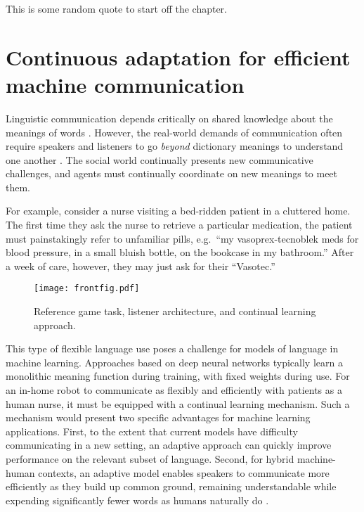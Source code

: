 \begin{savequote}[75mm]
This is some random quote to start off the chapter.
\end{savequote}

\chapter{Continuous adaptation for efficient machine communication}
\graphicspath{{./figures/nn_modeling/}}

Linguistic communication depends critically on shared knowledge about the meanings of words \cite{Lewis69_Convention}. 
However, the real-world demands of communication often require speakers and listeners to go \emph{beyond} dictionary meanings to understand one another \cite{clark_using_1996,stolk2016conceptual}. 
The social world continually presents new communicative challenges, and agents must continually coordinate on new meanings to meet them. %

For example, consider a nurse visiting a bed-ridden patient in a cluttered home.
The first time they ask the nurse to retrieve a particular medication, the patient must painstakingly refer to unfamiliar pills, e.g.~``my vasoprex-tecnoblek meds for blood pressure, in a small bluish bottle, on the bookcase in my bathroom.''
After a week of care, however, they may just ask for their ``Vasotec.'' 

\begin{figure}[t]
\centering
\texttt{[image: frontfig.pdf]}
\caption{Reference game task, listener architecture, and continual learning approach.}
\vspace{-1em}
\label{fig:refgame}
\end{figure}
This type of flexible language use poses a challenge for models of language in machine learning.
Approaches based on deep neural networks typically learn a monolithic meaning function during training, with fixed weights during use.
For an in-home robot to communicate as flexibly and efficiently with patients as a human nurse, it must be equipped with a continual learning mechanism. Such a mechanism would present two specific advantages for machine learning applications.
First, to the extent that current models have difficulty communicating in a new setting, an adaptive approach can quickly improve performance on the relevant subset of language.
Second, for hybrid machine-human contexts, an adaptive model enables speakers to communicate more efficiently as they build up common ground, remaining understandable while expending significantly fewer words as humans naturally do \cite{ClarkWilkesGibbs86_ReferringCollaborative}.


